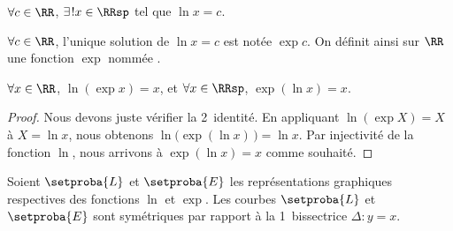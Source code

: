 \begin{fact}
	$\forall c \in \RR$,
	$\exists\kern1pt! x \in \RRsp$ tel que 
	$\ln x = c$.
\end{fact}




\begin{defi}
	$\forall c \in \RR$, 
	l'unique solution de $\ln x = c$ est notée $\exp c$.
	On définit ainsi sur $\RR$ une fonction $\exp$ nommée .
\end{defi}




\begin{fact}
	$\forall x \in \RR$, $\ln ( \exp x ) = x$,
	et
	$\forall x \in \RRsp$, $\exp ( \ln x ) = x$.
\end{fact}


\begin{proof}	
	Nous devons juste vérifier la 2\ieme\ identité.
	En appliquant $\ln ( \exp X ) = X$ à $X = \ln x$,
	nous obtenons $\ln \big( \exp ( \ln x ) \,\big) = \ln x$.
	Par injectivité de la fonction $\ln$, nous arrivons à $\exp ( \ln x ) = x$ comme souhaité.
\end{proof}




\begin{fact}
	Soient $\setproba{L}$ et $\setproba{E}$ les représentations graphiques respectives des fonctions $\ln$ et $\exp$.
	Les courbes $\setproba{L}$ et $\setproba{E}$ sont symétriques par rapport à la 1\iere\ bissectrice $\Delta: y = x$.
\end{fact}


